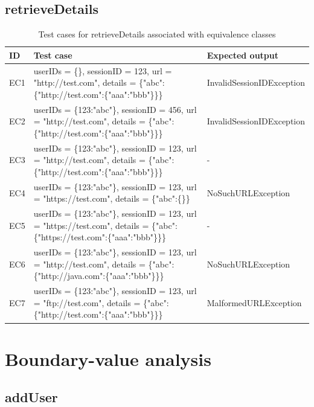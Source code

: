 \documentclass{article}
\begin{document}
\subsection{retrieveDetails}
\begin{longtable}{|p{2cm}|p{7cm}|p{5cm}|}
\caption{Test cases for retrieveDetails associated with equivalence classes}\\
\hline 
ID&Test case&Expected output\\
\hline  
EC1&userIDs = \{\}, sessionID = 123, url = "http://test.com", details = \{"abc":\{"http://test.com":\{"aaa":"bbb"\}\}\}&InvalidSessionIDException\\
\hline
EC2&userIDs = \{123:"abc"\}, sessionID = 456, url = "http://test.com", details = \{"abc":\{"http://test.com":\{"aaa":"bbb"\}\}\}&InvalidSessionIDException\\
\hline
EC3&userIDs = \{123:"abc"\}, sessionID = 123, url = "http://test.com", details = \{"abc":\{"http://test.com":\{"aaa":"bbb"\}\}\}&-\\
\hline
EC4&userIDs = \{123:"abc"\}, sessionID = 123, url = "https://test.com", details = \{"abc":\{\}\}&NoSuchURLException\\
\hline
EC5&userIDs = \{123:"abc"\}, sessionID = 123, url = "https://test.com", details = \{"abc":\{"https://test.com":\{"aaa":"bbb"\}\}\}&-\\
\hline
EC6&userIDs = \{123:"abc"\}, sessionID = 123, url = "http://test.com", details = \{"abc":\{"http://java.com":\{"aaa":"bbb"\}\}\}&NoSuchURLException\\
\hline
EC7&userIDs = \{123:"abc"\}, sessionID = 123, url = "ftp://test.com", details = \{"abc":\{"http://test.com":\{"aaa":"bbb"\}\}\}&MalformedURLException\\
\hline
\end{longtable}

\section{Boundary-value analysis}
\subsection{addUser}
\end{document}
